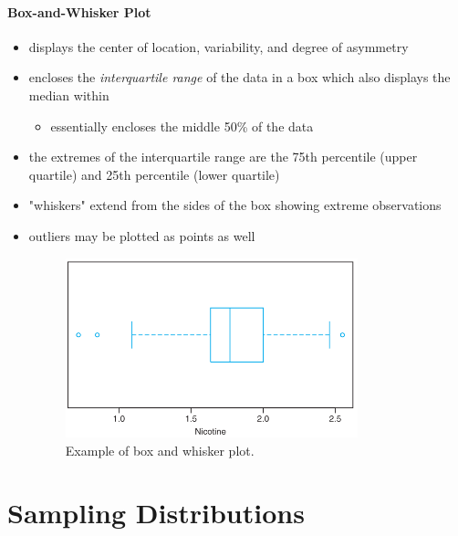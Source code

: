 \documentclass[10pt]{article}
\begin{document}
\subsection{Box-and-Whisker Plot}
\begin{itemize}
    \item displays the center of location, variability, and degree of asymmetry
    \item encloses the \textit{interquartile range} of the data in a box which also displays the median within
    \begin{itemize}
        \item essentially encloses the middle 50\% of the data
    \end{itemize}
    \item the extremes of the interquartile range are the 75th percentile (upper quartile) and 25th percentile (lower quartile)
    \item "whiskers" extend from the sides of the box showing extreme observations
    \item outliers may be plotted as points as well
        \begin{figure}[H]
            \centering
            \includegraphics[width=0.8\textwidth]{boxAndWhisker}
            \caption{Example of box and whisker plot.}
            \label{fig:boxAndWhisker}
        \end{figure}
\end{itemize}






\part{Sampling Distributions}
\end{document}
